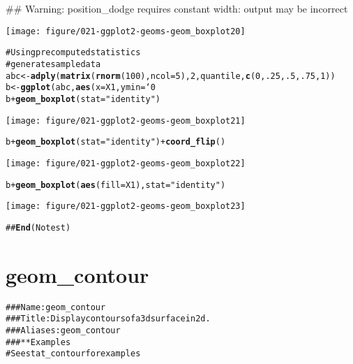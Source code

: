 \documentclass[a4paper,titlepage]{tufte-handout}\usepackage{graphicx, color}
\makeatletter
\def\maxwidth{ %
  \ifdim\Gin@nat@width>\linewidth
    \linewidth
  \else
    \Gin@nat@width
  \fi
}
\newcommand{\hlfunctioncall}[1]{\textcolor[rgb]{0.501960784313725,0,0.329411764705882}{\textbf{#1}}}%
\newcommand{\hlstring}[1]{\textcolor[rgb]{0.6,0.6,1}{#1}}%
\newcommand{\hlcomment}[1]{\textcolor[rgb]{0.180392156862745,0.6,0.341176470588235}{#1}}%
\newenvironment{kframe}{%
 \def\at@end@of@kframe{}%
 \ifinner\ifhmode%
  \def\at@end@of@kframe{\end{minipage}}%
  \begin{minipage}{\columnwidth}%
 \fi\fi%
 \def\FrameCommand##1{\hskip\@totalleftmargin \hskip-\fboxsep
 \colorbox{shadecolor}{##1}\hskip-\fboxsep
     \hskip-\linewidth \hskip-\@totalleftmargin \hskip\columnwidth}%
 \MakeFramed {\advance\hsize-\width
   \@totalleftmargin\z@ \linewidth\hsize
   \@setminipage}}%
 {\par\unskip\endMakeFramed%
 \at@end@of@kframe}
\newenvironment{knitrout}{}{} %
\makeatother
\begin{document}
\begin{knitrout}
\begin{kframe}
{\ttfamily\noindent\textcolor{warningcolor}{\#\# Warning: position\_dodge requires constant width: output may be incorrect}}\end{kframe}\texttt{[image: figure/021-ggplot2-geoms-geom\_boxplot20]} \begin{kframe}\begin{alltt}
\hlcomment{# Using precomputed statistics}
\hlcomment{# generate sample data}
abc <- \hlfunctioncall{adply}(\hlfunctioncall{matrix}(\hlfunctioncall{rnorm}(100), ncol = 5), 2, quantile, \hlfunctioncall{c}(0, .25, .5, .75, 1))
b <- \hlfunctioncall{ggplot}(abc, \hlfunctioncall{aes}(x = X1, ymin = `0%`, lower = `25%`, middle = `50%`, upper = `75%`, ymax = `100%`))
b + \hlfunctioncall{geom_boxplot}(stat = \hlstring{"identity"})
\end{alltt}
\end{kframe}\texttt{[image: figure/021-ggplot2-geoms-geom\_boxplot21]} \begin{kframe}\begin{alltt}
b + \hlfunctioncall{geom_boxplot}(stat = \hlstring{"identity"}) + \hlfunctioncall{coord_flip}()
\end{alltt}
\end{kframe}\texttt{[image: figure/021-ggplot2-geoms-geom\_boxplot22]} \begin{kframe}\begin{alltt}
b + \hlfunctioncall{geom_boxplot}(\hlfunctioncall{aes}(fill = X1), stat = \hlstring{"identity"})
\end{alltt}
\end{kframe}\texttt{[image: figure/021-ggplot2-geoms-geom\_boxplot23]} \begin{kframe}\begin{alltt}
\hlcomment{## \hlfunctioncall{End}(No test)}
\end{alltt}
\end{kframe}
\end{knitrout}


\section{geom\_contour}

\begin{knitrout}
\color{fgcolor}\begin{kframe}
\begin{alltt}
\hlcomment{### Name: geom_contour}
\hlcomment{### Title: Display contours of a 3d surface in 2d.}
\hlcomment{### Aliases: geom_contour}
\hlcomment{### ** Examples}
\hlcomment{# See stat_contour for examples}
\end{alltt}
\end{kframe}
\end{knitrout}
\end{document}
